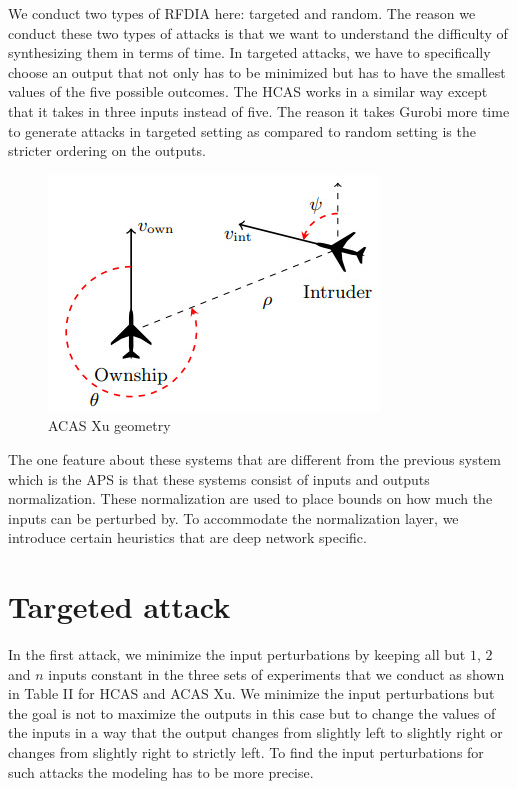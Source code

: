 We conduct two types of \ac{RFDIA} here: targeted and random. 
The reason we conduct these two types of attacks is that we want to understand the difficulty of synthesizing them in terms of time. 
In targeted attacks, we have to specifically choose an output that not only has to be minimized but has to have the smallest values of the five possible outcomes. 
The \ac{HCAS} works in a similar way except that it takes in three inputs instead of five. %
The reason it takes Gurobi more time to generate attacks in targeted setting as compared to random setting is the stricter ordering on the outputs. 

\begin{figure}
	\centering
	\includegraphics[width=0.7\linewidth]{Images/ACASXugeometry}
	\caption[ACAS Xu]{ACAS Xu geometry}
	\label{fig:acasxugeometry}
\end{figure}

The one feature about these systems that are different from the previous system which is the APS is that these systems consist of inputs and outputs normalization. These normalization are used to place bounds on how much the inputs can be perturbed by. To accommodate the normalization layer, we introduce certain heuristics that are deep network specific. %

\section{Targeted attack} 
In the first attack, we minimize the input perturbations by keeping all but $1$, $2$ and $n$ inputs constant in the three sets of experiments that we conduct as shown in Table II for HCAS and ACAS Xu. We minimize the input perturbations but the goal is not to maximize the outputs in this case but to change the values of the inputs in a way that the output changes from slightly left to slightly right or changes from slightly right to strictly left. To find the input perturbations for such attacks the modeling has to be more precise.

